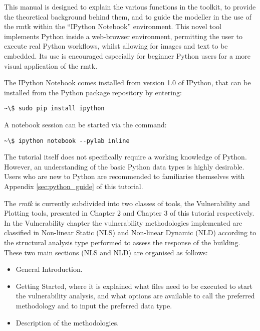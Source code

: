 This manual is designed to explain the various functions in the toolkit, to provide the theoretical background behind them, and to guide the modeller in the use of the rmtk within the ``IPython Notebook'' environment. This novel tool implements Python inside a web-browser environment, permitting the user to execute real Python workflows, whilst allowing for images and text to be embedded. Its use is encouraged especially for beginner Python users for a more visual application of the rmtk.

The IPython Notebook  comes installed from version 1.0 of IPython, that can be installed from the Python package repository by entering:

\begin{Verbatim}[frame=single, commandchars=\\\{\}, samepage=true]
~\$ sudo pip install ipython
\end{Verbatim}

A notebook session can be started via the command:

\begin{Verbatim}[frame=single, commandchars=\\\{\}, samepage=true]
~\$ ipython notebook --pylab inline
\end{Verbatim}

The tutorial itself does not specifically require a working knowledge of Python. However, an understanding of the basic Python data types is highly desirable. Users who are new to Python are recommended to familiarise themselves with Appendix \ref{sec:python_guide} of this tutorial.

The \textit{rmtk} is currently subdivided into two classes of tools, the Vulnerability and Plotting tools, presented in Chapter 2 and Chapter 3 of this tutorial respectively. In the Vulnerability chapter the vulnerability methodologies implemented are classified in Non-linear Static (NLS) and Non-linear Dynamic (NLD) according to the structural analysis type performed to assess the response of the building. These two main sections (NLS and NLD) are organised as follows:

\begin{itemize}
\item General Introduction.
\item Getting Started, where it is explained what files need to be executed to start the vulnerability analysis, and what options are available to call the preferred methodology and to input the preferred data type.
\item Description of the methodologies.
\end{itemize}


